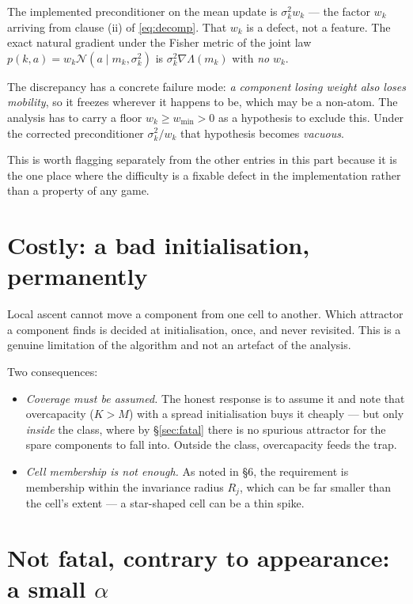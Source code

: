 \documentclass[11pt]{article}
\theoremstyle{definition}
\newcommand{\cN}{\mathcal{N}}
\begin{document}
The implemented preconditioner on the mean update is $\sigma_k^2 w_k$ --- the
factor $w_k$ arriving from clause (ii) of \eqref{eq:decomp}. That $w_k$ is a
defect, not a feature. The exact natural gradient under the Fisher metric of the
joint law $p(k,a) = w_k \cN(a \mid m_k, \sigma_k^2)$ is $\sigma_k^2
\nabla\Lambda(m_k)$ with \emph{no} $w_k$.

The discrepancy has a concrete failure mode: \emph{a component losing weight also
loses mobility}, so it freezes wherever it happens to be, which may be a
non-atom. The analysis has to carry a floor $w_k \ge w_{\min} > 0$ as a
hypothesis to exclude this. Under the corrected preconditioner $\sigma_k^2/w_k$
that hypothesis becomes \emph{vacuous}.

This is worth flagging separately from the other entries in this part because it
is the one place where the difficulty is a fixable defect in the implementation
rather than a property of any game.

\section{Costly: a bad initialisation, permanently}

Local ascent cannot move a component from one cell to another. Which attractor a
component finds is decided at initialisation, once, and never revisited. This is
a genuine limitation of the algorithm and not an artefact of the analysis.

Two consequences:
\begin{itemize}[leftmargin=1.4em, itemsep=2pt]
\item \emph{Coverage must be assumed.} The honest response is to assume it and
  note that overcapacity ($K > M$) with a spread initialisation buys it cheaply
  --- but only \emph{inside} the class, where by \S\ref{sec:fatal} there is no
  spurious attractor for the spare components to fall into. Outside the class,
  overcapacity feeds the trap.
\item \emph{Cell membership is not enough.} As noted in \S6, the requirement is
  membership within the invariance radius $R_j$, which can be far smaller than the
  cell's extent --- a star-shaped cell can be a thin spike.
\end{itemize}

\section{Not fatal, contrary to appearance: a small $\alpha$}
\end{document}
